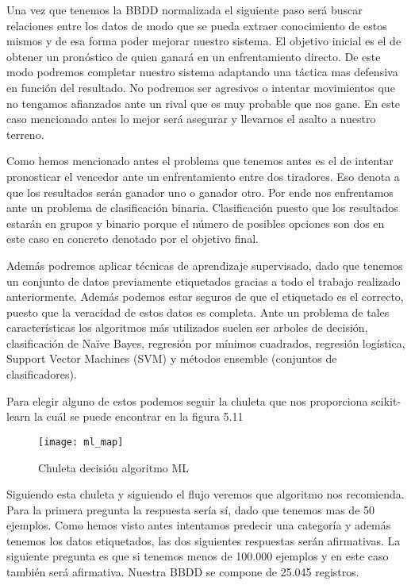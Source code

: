 Una vez que tenemos la BBDD normalizada el siguiente paso será buscar relaciones
entre los datos de modo que se pueda extraer conocimiento de estos mismos y de
esa forma poder mejorar nuestro sistema. El objetivo inicial es el de obtener
un pronóstico de quien ganará en un enfrentamiento directo. De este modo podremos
completar nuestro sistema adaptando una táctica mas defensiva en función
del resultado. No podremos ser agresivos o intentar movimientos que no tengamos afianzados
ante un rival que es muy probable que nos gane. En este caso mencionado antes lo mejor
será asegurar y llevarnos el asalto a nuestro terreno.

Como hemos mencionado antes el problema que tenemos antes es el de intentar pronosticar
el vencedor ante un enfrentamiento entre dos tiradores. Eso denota a que los resultados
serán ganador uno o ganador otro. Por ende nos enfrentamos ante un problema de clasificación
binaria. Clasificación puesto que los resultados estarán en grupos y binario porque el número
de posibles opciones son dos en este caso en concreto denotado por el objetivo final.

Además podremos aplicar técnicas de aprendizaje supervisado, dado que tenemos un conjunto de datos
previamente etiquetados gracias a todo el trabajo realizado anteriormente. Además podemos
estar seguros de que el etiquetado es el correcto, puesto que la veracidad de estos datos
es completa. Ante un problema de tales características los algoritmos más utilizados suelen ser
arboles de decisión, clasificación de Naïve Bayes, regresión por mínimos cuadrados, regresión
logística, Support Vector Machines (SVM) y métodos ensemble (conjuntos de clasificadores).

Para elegir alguno de estos podemos seguir la chuleta que nos proporciona scikit-learn la cuál se
puede encontrar en la figura 5.11

\begin{figure}[htb]
  \centering
    \texttt{[image: ml\_map]}
  \caption[Chuleta decisión algoritmo ML]{Chuleta decisión algoritmo ML}
  \label{fig:Chuleta decisión algoritmo ML}
\end{figure}

Siguiendo esta chuleta y siguiendo el flujo veremos que algoritmo nos recomienda.
Para la primera pregunta la respuesta sería sí, dado que tenemos mas de 50 ejemplos.
Como hemos visto antes intentamos predecir una categoría y además tenemos los datos
etiquetados, las dos siguientes respuestas serán afirmativas. La siguiente pregunta
es que si tenemos menos de 100.000 ejemplos y en este caso también será afirmativa.
Nuestra BBDD se compone de 25.045 registros.

